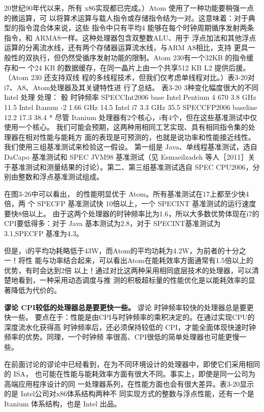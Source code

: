 20世纪90年代以来，所有 x86实现都已完成。）Atom 使用了一种功能要稍强一点的微运算，可
以将算术运算与载人指令或存储指令结为一对。这意味着：对于典型的指令混合体来说，这些
指令中只有平均4%
能够在每个时钟周期循序发射两条指令，和 ARMA8一样。这种处理器包含双整数ALU、用于
浮点加法和其他浮点运算的分离流水线，还有两个存储器运算流水线，与ARM A8相比，支持
更具一般性的双执行，但仍然受循序发射功能的限制。Atom 230有一个32KB 的指令缓存和一
个24 KB 的数据缓存，在同一晶片上由一个共享512 KB L2 提供后援。（Atom 230 还支持双线
程的多线程技术，但我们仅考虑单线程对比。）表3-20对i7、A8、Atom处理器及其关键特性进
行了总结。
表3-20 3种变化幅度很大的不同 Intel 处理
处理：
骰
时钟频率
SPECCInt2006 base
Intel Pentium 4 670
3.8 GHz
11.5
Intel Itanum -2
1.66 GHz
14.5
Intel i7
3.3 GHz
35.5
SPECCFP2006 baseline
12.2
17.3
38.4
* 尽管 Itanium 处理器有2个核心，i有4个，但在这些基准测试中仅使用一个核心。
我们可能会预期，这两种用相同工艺实现、具有相同指令集的处理器在相对性能与能耗方
面的表现是可预测的，也就是说功率和性能接近线性。我们使用三组基准测试来检验这一假设。
第一组是 Java、单线程基准测试，选自 DaCapo 基准测试和 SPEC JVM98 基准测试（见
Esmaeilzadeh 等人［2011］关于基准测试和测量结果的讨论）。第二、第三组基准测试选自 SPEC
CPU2006，分别由整数和浮点基准测试组成。

在图3-26中可以看出， 的性能明显优于 Atom。所有基准测试在17上都至少快4倍，两
个 SPECFP 基准测试快 10倍以上，一个 SPECINT 基准测试的运行速度要快8倍以上。
由于这两个处理器的时钟频率比为1.6，所以大多数优势体现在i7的CPI要低得多：对于
Java 基本测试为2.8，对于 SPECINT基准测试为3.1,SPECFP 基准为4.3。

但是，i的平均功耗略低于43W，而Atom的平均功耗为4.2W，为前者的十分之一！将性
能与功率结合起来，可以看出Atom在能耗效率方面通常有1.5倍以上的优势，有时会达到2倍
以上！通过对比这两种采用相同底层技术的处理器，可以清楚地看到，一种采用动态调度与推
测的积极超标量的性能优化是以能耗效率的显著降低为代价的。

\textbf{谬论 CPI较低的处理器总是要更快一些。}
谬论 时钟频率较快的处理器总是要更快一些。
要点在于：性能是由CPI与时钟频率的乘积决定的。在通过实现CPU的深度流水化获得高
时钟频率后，还必须保持较低的 CPI，才能全面体现快速时钟频率的优势。同理，一个时钟频
率很高、CPI很低的简单处理器也可能更慢一些。

在前面讨论的谬论中已经看到，在为不同环境设计的处理器中，即使它们采用相同的 ISA，
也可能在性能与能耗效率方面有很大不同。事实上，即使是同一公司为高端应用程序设计的同
一处理器系列，在性能方面也会有很大差异。表3-20显示的是 Intel公司对x86体系结构两种不
同实现方式的整数与浮点性能，还有一个是 Itanium 体系结构，也是 Intel 出品。

